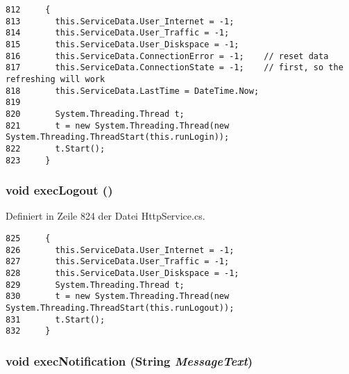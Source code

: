 \footnotesize\begin{verbatim}812     {
813       this.ServiceData.User_Internet = -1;
814       this.ServiceData.User_Traffic = -1;
815       this.ServiceData.User_Diskspace = -1;
816       this.ServiceData.ConnectionError = -1;    // reset data
817       this.ServiceData.ConnectionState = -1;    // first, so the refreshing will work
818       this.ServiceData.LastTime = DateTime.Now;
819 
820       System.Threading.Thread t;
821       t = new System.Threading.Thread(new System.Threading.ThreadStart(this.runLogin));
822       t.Start();
823     }
\end{verbatim}\normalsize 
\hypertarget{classQbeSAS_1_1HttpService_QbeSAS_1_1HttpServiced11}{
\subsubsection[execLogout]{\setlength{\rightskip}{0pt plus 5cm}void exec\-Logout ()}}
\label{classQbeSAS_1_1HttpService_QbeSAS_1_1HttpServiced11}




Definiert in Zeile 824 der Datei Http\-Service.cs.



\footnotesize\begin{verbatim}825     {
826       this.ServiceData.User_Internet = -1;
827       this.ServiceData.User_Traffic = -1;
828       this.ServiceData.User_Diskspace = -1;
829       System.Threading.Thread t;
830       t = new System.Threading.Thread(new System.Threading.ThreadStart(this.runLogout));
831       t.Start();
832     }
\end{verbatim}\normalsize 
\hypertarget{classQbeSAS_1_1HttpService_QbeSAS_1_1HttpServiced12}{
\subsubsection[execNotification]{\setlength{\rightskip}{0pt plus 5cm}void exec\-Notification (String {\em Message\-Text})}}
\label{classQbeSAS_1_1HttpService_QbeSAS_1_1HttpServiced12}




